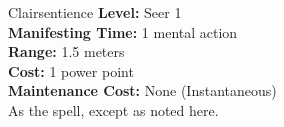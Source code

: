 {Clairsentience}
{
	\textbf{Level:}
	Seer 1\\
	\textbf{Manifesting Time:}
	1 mental action\\
	\textbf{Range:}
	1.5 meters\\
	\textbf{Cost:}
	1 power point\\
	\textbf{Maintenance Cost:}
	None (Instantaneous)\\
}
{
	As the  spell, except as noted here.
}
